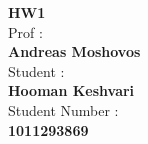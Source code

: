 \begin{center}
    \textbf{HW1}
    \\
    \vspace*{7mm}
    Prof :
    \\
    \vspace*{2mm}
    \textbf{\Large{Andreas Moshovos}}
    \\
    \vspace*{7mm}
    Student :
    \\
    \vspace*{2mm}
    \textbf{\Large{Hooman Keshvari}}
    \\
    \vspace*{7mm}
    Student Number :
    \\
    \vspace*{2mm}
    \textbf{\Large{1011293869}}
\end{center}